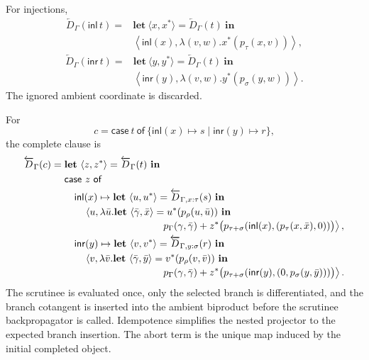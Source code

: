 \documentclass[runningheads,envcountsame]{llncs}
\begin{document}
For injections,
$$
\begin{aligned}
\overleftarrow D_\Gamma(\mathsf{inl}\,t)
={}&
\mathbf{let}\ \langle x,x^*\rangle=\overleftarrow D_\Gamma(t)\ \mathbf{in}\\
&\left\langle
\mathsf{inl}(x),
\lambda(v,w).x^*(p_\tau(x,v))
\right\rangle,
\end{aligned}
$$
$$
\begin{aligned}
\overleftarrow D_\Gamma(\mathsf{inr}\,t)
={}&
\mathbf{let}\ \langle y,y^*\rangle=\overleftarrow D_\Gamma(t)\ \mathbf{in}\\
&\left\langle
\mathsf{inr}(y),
\lambda(v,w).y^*(p_\sigma(y,w))
\right\rangle.
\end{aligned}
$$
The ignored ambient coordinate is discarded.

For
$$
c=
\mathsf{case}\ t\ \mathsf{of}\
\{\mathsf{inl}(x)\mapsto s
\mid
\mathsf{inr}(y)\mapsto r\},
$$
the complete clause is
$$
\begin{aligned}
\overleftarrow D_\Gamma(c)
={}&\mathbf{let}\ \langle z,z^*\rangle=
\overleftarrow D_\Gamma(t)\ \mathbf{in}\\
&\mathsf{case}\ z\ \mathsf{of}\\
&\quad\mathsf{inl}(x)\mapsto
\mathbf{let}\ \langle u,u^*\rangle=
\overleftarrow D_{\Gamma,x:\tau}(s)\ \mathbf{in}\\
&\qquad\left\langle u,\lambda\bar u.
\mathbf{let}\ \langle\bar\gamma,\bar x\rangle=
 u^*(p_\rho(u,\bar u))\ \mathbf{in}\right.\\[-.2em]
&\hspace{9.7em}\left.
 p_\Gamma(\gamma,\bar\gamma)+
 z^*\bigl(p_{\tau+\sigma}(\mathsf{inl}(x),(p_\tau(x,\bar x),0))\bigr)
\right\rangle,\\
&\quad\mathsf{inr}(y)\mapsto
\mathbf{let}\ \langle v,v^*\rangle=
\overleftarrow D_{\Gamma,y:\sigma}(r)\ \mathbf{in}\\
&\qquad\left\langle v,\lambda\bar v.
\mathbf{let}\ \langle\bar\gamma,\bar y\rangle=
 v^*(p_\rho(v,\bar v))\ \mathbf{in}\right.\\[-.2em]
&\hspace{9.7em}\left.
 p_\Gamma(\gamma,\bar\gamma)+
 z^*\bigl(p_{\tau+\sigma}(\mathsf{inr}(y),(0,p_\sigma(y,\bar y)))\bigr)
\right\rangle.
\end{aligned}
$$
The scrutinee is evaluated once, only the selected branch is differentiated, and the branch cotangent is inserted into the ambient biproduct before the scrutinee backpropagator is called. Idempotence simplifies the nested projector to the expected branch insertion. The abort term is the unique map induced by the initial completed object.
\end{document}

